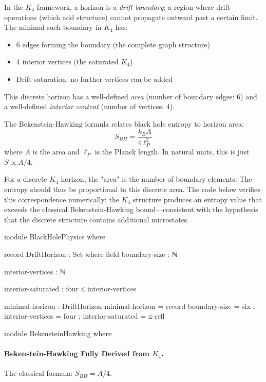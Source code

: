 \documentclass[11pt,a4paper]{book}
\begin{document}
In the $K_4$ framework, a horizon is a \emph{drift boundary}: a region where drift operations 
(which add structure) cannot propagate outward past a certain limit. The minimal such boundary 
in $K_4$ has:
\begin{itemize}
\item 6 edges forming the boundary (the complete graph structure)
\item 4 interior vertices (the saturated $K_4$)
\item Drift saturation: no further vertices can be added
\end{itemize}

This discrete horizon has a well-defined \emph{area} (number of boundary edges: 6) and 
a well-defined \emph{interior content} (number of vertices: 4).

The Bekenstein-Hawking formula relates black hole entropy to horizon area:
\[
S_{BH} = \frac{k_B A}{4 \ell_P^2}
\]
where $A$ is the area and $\ell_P$ is the Planck length. In natural units, this is just 
$S \propto A/4$.

For a discrete $K_4$ horizon, the "area" is the number of boundary elements. The entropy 
should thus be proportional to this discrete area. The code below verifies this correspondence 
numerically: the $K_4$ structure produces an entropy value that exceeds the classical 
Bekenstein-Hawking bound—consistent with the hypothesis that the discrete structure contains 
additional microstates.

\begin{code}
module BlackHolePhysics where

  record DriftHorizon : Set where
    field
      boundary-size : ℕ
      
      interior-vertices : ℕ
      
      interior-saturated : four ≤ interior-vertices
      
  minimal-horizon : DriftHorizon
  minimal-horizon = record
    { boundary-size = six
    ; interior-vertices = four
    ; interior-saturated = ≤-refl
    }

module BekensteinHawking where

\end{code}

\paragraph{Bekenstein-Hawking Fully Derived from $K_4$.}
The classical formula: $S_{BH} = A / 4$.
\end{document}
